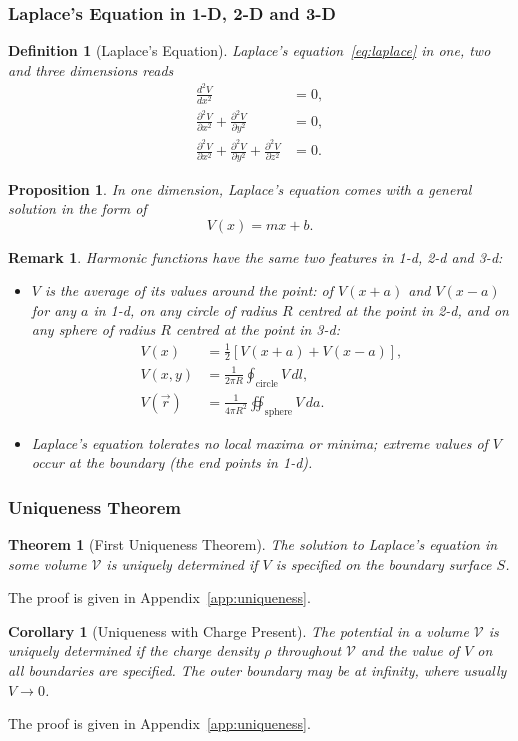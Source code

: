 \documentclass{article}
\newtheorem{theorem}{Theorem}
\newtheorem{corollary}{Corollary}[theorem]
\newtheorem{definition}{Definition}
\newtheorem{remark}{Remark}
\newtheorem{proposition}{Proposition}
\begin{document}
\subsubsection{Laplace's Equation in 1-D, 2-D and 3-D}
\begin{definition}[Laplace's Equation]
    Laplace's equation~\eqref{eq:laplace} in one, two and three dimensions reads
    \begin{align*}
        \frac{d^2 V}{dx^2} &= 0, \\
        \frac{\partial^2 V}{\partial x^2}+\frac{\partial^2 V}{\partial y^2} &= 0, \\
        \frac{\partial^2 V}{\partial x^2}+\frac{\partial^2 V}{\partial y^2}+\frac{\partial^2 V}{\partial z^2} &= 0.
    \end{align*}
\end{definition}
\begin{proposition}
    In one dimension, Laplace's equation comes with a general solution in the form of
    \[V(x) = mx+b.\]
\end{proposition}
\begin{remark}
    Harmonic functions have the same two features in 1-d, 2-d and 3-d:
    \begin{itemize}
        \item $V$ is the average of its values around the point: of $V(x+a)$ and $V(x-a)$ for any $a$ in 1-d, on any circle of radius $R$ centred at the point in 2-d, and on any sphere of radius $R$ centred at the point in 3-d:
        \begin{align*}
            V(x) &= \frac{1}{2}[V(x+a)+V(x-a)], \\
            V(x,y) &= \frac{1}{2\pi R}\oint_{\text{circle}}V\,dl, \\
            V(\vec{r}) &= \frac{1}{4\pi R^2}\oiint_{\text{sphere}}V\,da.
        \end{align*}
        \item Laplace's equation tolerates no local maxima or minima; extreme values of $V$ occur at the boundary (the end points in 1-d).
    \end{itemize}
\end{remark}

\subsubsection{Uniqueness Theorem}
\begin{theorem}[First Uniqueness Theorem]
    \label{thm:uniqueness1}
    The solution to Laplace's equation in some volume $\mathcal{V}$ is uniquely determined if $V$ is specified on the boundary surface $S$.
\end{theorem}
\noindent The proof is given in Appendix~\ref{app:uniqueness}.
\begin{corollary}[Uniqueness with Charge Present]
    \label{cor:uniqueness}
    The potential in a volume $\mathcal{V}$ is uniquely determined if the charge density $\rho$ throughout $\mathcal{V}$ and the value of $V$ on all boundaries are specified. The outer boundary may be at infinity, where usually $V \to 0$.
\end{corollary}
\noindent The proof is given in Appendix~\ref{app:uniqueness}.
\end{document}
